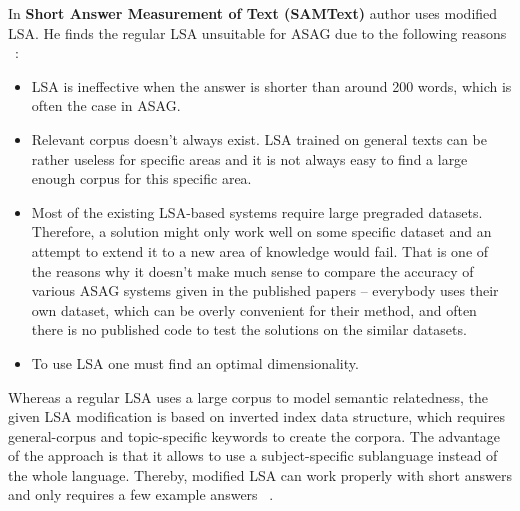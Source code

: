 \documentclass[11pt]{report}
\numberwithin{equation}{section} %
\begin{document}
In \textbf{Short Answer Measurement of Text (SAMText)} author uses modified LSA. He finds the regular LSA unsuitable for ASAG due to the following reasons ~\cite{SAMText}:
\begin{itemize}
\item LSA is ineffective when the answer is shorter than around 200 words, which is often the case in ASAG.
\item Relevant corpus doesn't always exist. LSA trained on general texts can be rather useless for specific areas and it is not always easy to find a large enough corpus for this specific area.
\item Most of the existing LSA-based systems require large pregraded datasets. Therefore, a solution might only work well on some specific dataset and an attempt to extend it to a new area of knowledge would fail. That is one of the reasons why it doesn't make much sense to compare the accuracy of various ASAG systems given in the published papers -- everybody uses their own dataset, which can be overly convenient for their method, and often there is no published code to test the solutions on the similar datasets. 
\item To use LSA one must find an optimal dimensionality.
\end{itemize}
Whereas a regular LSA uses a large corpus to model semantic relatedness, the given LSA modification is based on inverted index data structure, which requires general-corpus and topic-specific keywords to create the corpora. The advantage of the approach is that it allows to use a subject-specific sublanguage  instead of the whole language. Thereby, modified LSA can work properly with short answers and only requires a few example answers ~\cite{Burrows}.\\
\end{document}
